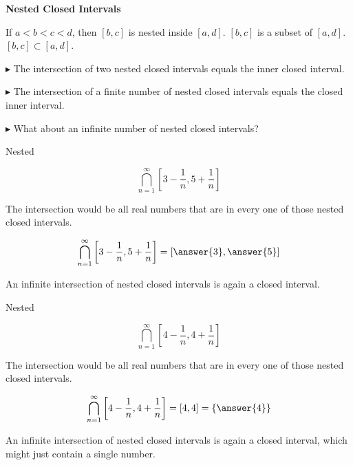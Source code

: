 \documentclass{ximera}
\begin{document}
\textbf{Nested Closed Intervals}

If $a < b < c < d$, then $[b,c]$ is nested inside $[a,d]$.   $[b,c]$ is a subset of $[a,d]$.  $[b,c] \subset [a,d]$.



$\blacktriangleright$  The intersection of two nested closed intervals equals the inner closed interval.

$\blacktriangleright$  The intersection of a finite number of nested closed intervals equals the closed inner interval.

$\blacktriangleright$ What about an infinite number of nested closed intervals?



\begin{example} Nested


\[ \bigcap_{n=1}^{\infty}   \left[3 - \frac{1}{n}, 5 + \frac{1}{n}\right]     \]



The intersection would be all real numbers that are in every one of those nested closed intervals.


\[ \bigcap_{n=1}^{\infty}   \left[3 - \frac{1}{n}, 5 + \frac{1}{n}\right]  = \left[\answer{3}, \answer{5}\right]   \]





\end{example} 


An infinite intersection of nested closed intervals is again a closed interval. \\






\begin{example} Nested


\[ \bigcap_{n=1}^{\infty}   \left[4 - \frac{1}{n}, 4 +  \frac{1}{n}\right]     \]



The intersection would be all real numbers that are in every one of those nested closed intervals.


\[ \bigcap_{n=1}^{\infty}   \left[4 -  \frac{1}{n}, 4 + \frac{1}{n}\right]    = [4, 4] = \left\{ \answer{4} \right\}  \]





\end{example}


An infinite intersection of nested closed intervals is again a closed interval, which might just contain a single number. \\
\end{document}
